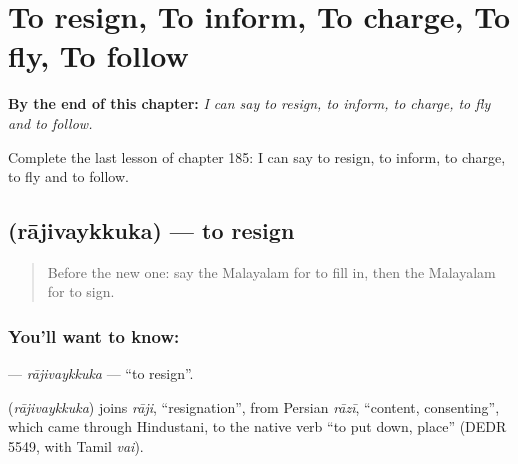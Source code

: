 
\chapter{To resign, To inform, To charge, To fly, To follow}
\label{ch:ml-to-resign-to-inform-to-charge-to-fly-to-follow}

\begin{chapteropening}
\textbf{By the end of this chapter:} \emph{I can say to resign, to inform, to charge, to fly and to follow.}

Complete the last lesson of chapter 185: I can say to resign, to inform, to charge, to fly and to follow.
\end{chapteropening}

\section[\texorpdfstring{\ml{രാജിവയ്ക്കുക} (rājivaykkuka)}{രാജിവയ്ക്കുക (rājivaykkuka)}]{ (rājivaykkuka) — to resign}

\label{lesson:ML-C185-rajivaykkuka}



\begin{quote}
Before the new one: say the Malayalam for to fill in, then the Malayalam for to sign.
\end{quote}

\subsection*{You'll want to know: }
\textbf{} — \emph{rājivaykkuka} — \textquotedblleft{}to resign\textquotedblright{}.

\begin{cousinweb}
\textbf{} (\emph{rājivaykkuka}) joins \emph{rāji}, \textquotedblleft{}resignation\textquotedblright{}, from Persian \emph{rāzī}, \textquotedblleft{}content, consenting\textquotedblright{}, which came through Hindustani, to the native verb \textquotedblleft{}to put down, place\textquotedblright{} (DEDR 5549, with Tamil \emph{vai}).
\end{cousinweb}

